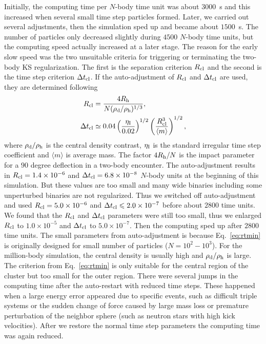 \documentclass[usenatbib,aas_macros]{mn2e}
\def\nb{$N$-body }
\begin{document}
Initially, the computing time per \nb time unit was about $3000$~s and this increased when several small time step particles formed. 
Later, we carried out several adjustments, then the simulation sped up and became about $1500$~s. 
The number of particles only decreased slightly during $4500$ \nb time units, but the computing speed actually increased at a later stage. 
The reason for the early slow speed was the two unsuitable criteria for triggering or terminating the two-body KS regularization.
The first is the separation criterion $R_{\rm cl}$ and the second is the time step criterion $\Delta t_{\rm cl}$. 
If the auto-adjustment of $R_{\rm cl}$ and $\Delta t_{\rm cl}$ are used, they are determined following \cite{Aarseth2003}
\begin{equation}
  \label{eq:rtmin}
  \begin{aligned}
    R_{\rm cl} & = \frac{4 R_{\rm h}}{N (\rho_{\rm d} / \rho_{\rm h})^{1/3}}, \\
    \Delta t_{\rm cl} & \simeq 0.04 \left( \frac{\eta_{\rm I}}{0.02} \right)^{1/2} \left( \frac{R_{\rm cl}^3}{\langle m \rangle} \right)^{1/2},
  \end{aligned}
\end{equation}
where $\rho_{\rm d}/\rho_{\rm h}$ is the central density contrast, $\eta_{\rm I}$ is the standard irregular time step coefficient and $\langle m \rangle$ is average mass. 
The factor $4 R_{\rm h} / N$ is the impact parameter for a $90$ degree deflection in a two-body encounter. 
The auto-adjustment results in $R_{\rm cl} = 1.4\times 10^{-6}$ and $\Delta t_{\rm cl} = 6.8 \times 10^{-8}$ \nb units at the beginning of this simulation. 
But these values are too small and many wide binaries including some unperturbed binaries are not regularized. 
Thus we switched off auto-adjustment and used $R_{\rm cl} = 5.0\times 10^{-6}$ and $\Delta t_{\rm cl} \le 2.0 \times 10^{-7}$ before about $2800$ time units. 
We found that the $R_{\rm cl}$ and $\Delta t_{\rm cl}$ parameters were still too small, thus we enlarged $R_{\rm cl}$ to $1.0 \times 10^{-5} $ and $\Delta t_{\rm cl}$ to $5.0 \times 10^{-7}$. 
Then the computing sped up after $2800$ time units.
The small parameters from auto-adjustment is because Eq.~\ref{eq:rtmin} is originally designed for small number of particles ($N = 10^2-10^3$). 
For the million-body simulation, the central density is usually high and $\rho_{\rm d}/\rho_{\rm h}$ is large. 
The criterion from Eq.~\ref{eq:rtmin} is only suitable for the central region of the cluster but too small for the outer region.
There were several jumps in the computing time after the auto-restart with reduced time steps.
These happened when a large energy error appeared due to specific events, such as difficult triple systems or the sudden change of force caused by large mass loss or premature perturbation of the neighbor sphere (such as neutron stars with high kick velocities).
After we restore the normal time step parameters the computing time was again reduced.
\end{document}
